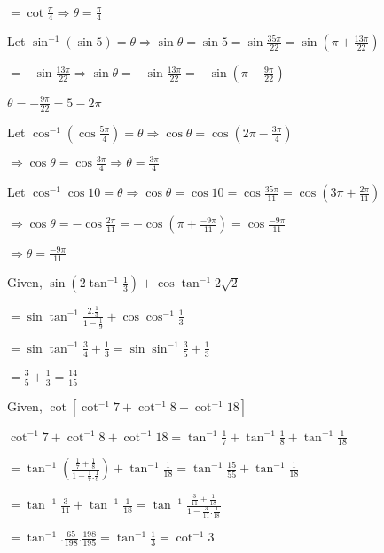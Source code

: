   $= \cot\frac{\pi}{4}\Rightarrow \theta = \frac{\pi}{4}$

\item Let $\sin^{-1}(\sin5) = \theta \Rightarrow \sin\theta = \sin5 = \sin\frac{35\pi}{22} = \sin\left(\pi +
  \frac{13\pi}{22}\right)$

  $= -\sin\frac{13\pi}{22} \Rightarrow \sin\theta = -\sin\frac{13\pi}{22} = -\sin\left(\pi - \frac{9\pi}{22}\right)$

  $\theta = -\frac{9\pi}{22} = 5 - 2\pi$

\item Let $\cos^{-1}(\cos\frac{5\pi}{4}) = \theta \Rightarrow \cos\theta = \cos\left(2\pi - \frac{3\pi}{4}\right)$

  $\Rightarrow \cos\theta = \cos\frac{3\pi}{4} \Rightarrow \theta = \frac{3\pi}{4}$

\item Let $\cos^{-1}\cos10 = \theta \Rightarrow \cos\theta = \cos10 = \cos\frac{35\pi}{11} = \cos\left(3\pi +
  \frac{2\pi}{11}\right)$

  $\Rightarrow \cos\theta = -\cos\frac{2\pi}{11} = -\cos\left(\pi + \frac{-9\pi}{11}\right) = \cos\frac{-9\pi}{11}$

  $\Rightarrow \theta = \frac{-9\pi}{11}$

\item Given, $\sin\left(2\tan^{-1}\frac{1}{3}\right) + \cos\tan^{-1}2\sqrt{2}$

  $= \sin\tan^{-1}\frac{2.\frac{1}{3}}{1 - \frac{1}{9}} + \cos\cos^{-1}\frac{1}{3}$

  $= \sin\tan^{-1}\frac{3}{4} + \frac{1}{3} = \sin\sin^{-1}\frac{3}{5} + \frac{1}{3}$

  $= \frac{3}{5} + \frac{1}{3} = \frac{14}{15}$

\item Given, $\cot[\cot^{-1}7 + \cot^{-1}8 + \cot^{-1}18]$

  $\cot^{-1}7 + \cot^{-1}8 + \cot^{-1}18 = \tan^{-1}\frac{1}{7} + \tan^{-1}\frac{1}{8} + \tan^{-1}\frac{1}{18}$

  $= \tan^{-1}\left(\frac{\frac{1}{7} + \frac{1}{8}}{1 - \frac{1}{7}.\frac{1}{8}}\right) + \tan^{-1}\frac{1}{18}=
  \tan^{-1}\frac{15}{55} + \tan^{-1}\frac{1}{18}$

  $= \tan^{-1}\frac{3}{11} + \tan^{-1}\frac{1}{18} = \tan^{-1}\frac{\frac{3}{11} + \frac{1}{18}}{1 -
    \frac{3}{11}.\frac{1}{18}}$

  $= \tan^{-1}.\frac{65}{198}.\frac{198}{195} = \tan^{-1}\frac{1}{3} = \cot^{-1}3$

